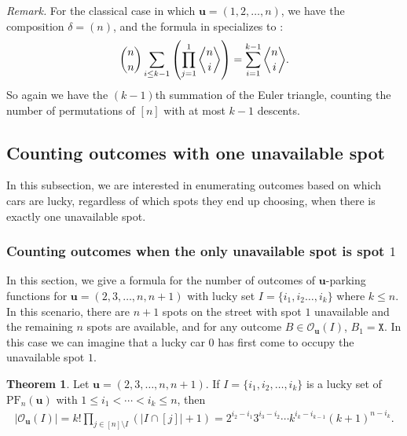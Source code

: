\documentclass[reqno]{amsart}
\newcommand{\X}{\texttt{X}}
\newcommand{\PF}{\mathrm{PF}}
\theoremstyle{definition}
\newtheorem{theorem}{Theorem}[section]
\theoremstyle{remark}
\newcommand{\out}{\mathcal{O}}
\newcommand{\bsy}{\boldsymbol}
\begin{document}
\emph{Remark.} For the classical case in which $\bsy{u} = (1,2,\ldots, n)$, we have the composition $\delta = (n)$, and the formula in  specializes to :
\[
\binom{n }{n}\sum_{i \leq k-1} \left( \prod_{j=1}^{1} \genfrac{\langle}{\rangle}{0pt}{}{n}{i} \right) = \sum_{i=1}^{k-1} \genfrac{\langle}{\rangle}{0pt}{}{n}{i}.
\]
So again we have the $(k-1)$th summation of the Euler triangle, counting the number of permutations of $[n]$ with at most $k-1$ descents.



\subsection{Counting outcomes with one unavailable spot}\label{sec:one unavailable spot}

In this subsection, we are interested in enumerating outcomes based on which cars are lucky, regardless of which spots they end up choosing, when there is exactly one unavailable spot.

\subsubsection{Counting outcomes when the only unavailable spot is spot $1$}\label{subsec: spot 1 is unavailable}
In this section, we give a formula for the number of outcomes of $\bsy{u}$-parking functions for $\bsy{u} = (2,3,\ldots, n , n+1)$ with lucky set $I = \{i_1, i_2 \ldots, i_k\}$ where $k\leq n$. In this scenario, there are $n+1$ spots on the street with spot $1$ unavailable and the remaining $n$ spots are available, and for any outcome $B\in \out_{\bsy{u}}(I)$, $B_1=\X$. In this case we can imagine that a lucky car $0$ has first come to occupy the unavailable spot $1$. 



\begin{theorem}\label{thm:count for outcomes with forbidden spot one}
Let $\bsy{u} = (2,3,\ldots,n,  n+1)$. If $I = \{i_1, i_2, \ldots, i_{k}\}$ is a lucky set of $\PF_n(\bsy{u})$ with $1\leq i_1 <\cdots < i_{k} \leq n$, then
\begin{align}\label{eq:rhs}
|\out_{\bsy u}(I)|=k! \prod_{j\in [n]\setminus I} (|I \cap [j]|+1) =2^{i_2-i_1}3^{i_3-i_2}\cdots k^{i_{k}-i_{k-1}} (k+1)^{n-i_k}.
\end{align}
\end{theorem}
\end{document}
